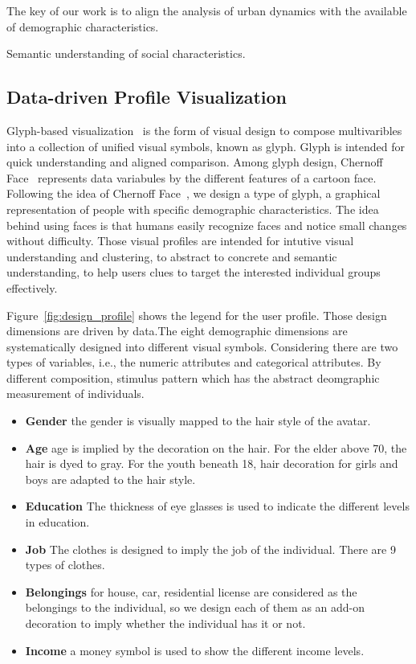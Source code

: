 The key of our work is to align the analysis of urban dynamics with the available of demographic characteristics. 

Semantic understanding of social characteristics.

\subsection{Data-driven Profile Visualization}

Glyph-based visualization~\cite{borgo2013glyph} is the form of visual design to compose multivaribles into a collection of unified visual symbols, known as glyph. Glyph is intended for quick understanding and aligned comparison. Among glyph design, Chernoff Face~\cite{chernoff1973use} represents data variabules by the different features of a cartoon face. Following the idea of Chernoff Face~\cite{chernoff1973use}, we design a type of glyph, a graphical representation of people with specific demographic characteristics. The idea behind using faces is that humans easily recognize faces and notice small changes without difficulty. Those visual profiles are intended for intutive visual understanding and clustering, to abstract to concrete and semantic understanding, to help users clues to target the interested individual groups effectively.

Figure~\ref{fig:design_profile} shows the legend for the user profile. Those design dimensions are driven by data.The eight demographic dimensions are systematically designed into different visual symbols. Considering there are two types of variables, i.e., the numeric attributes and categorical attributes. By different composition, stimulus pattern which has the abstract deomgraphic measurement of individuals.

\begin{itemize}
\item \textbf{Gender} the gender is visually mapped to the hair style of the avatar. 
\item \textbf{Age} age is implied by the decoration on the hair. For the elder above 70, the hair is dyed to gray. For the youth beneath 18, hair decoration for girls and boys are adapted to the hair style.
\item \textbf{Education} The thickness of eye glasses is used to indicate the different levels in education.
\item \textbf{Job} The clothes is designed to imply the job of the individual. There are 9 types of clothes.
\item \textbf{Belongings} for house, car, residential license are considered as the belongings to the individual, so we design each of them as an add-on decoration to imply whether the individual has it or not.
\item \textbf{Income} a money symbol is used to show the different income levels.
\end{itemize} 

